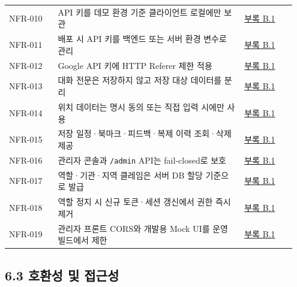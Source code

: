 \documentclass[12pt,a4paper]{article}
\newcommand{\DocNeedspace}[1]{\par\ifdim\dimexpr\pagegoal-\pagetotal\relax<#1\newpage\fi}
\renewcommand{\arraystretch}{1.35}
\newcommand{\AppendixRef}[2]{\hyperlink{app:#1#2}{부록 #1.#2}}
\begin{document}
\DocNeedspace{26\baselineskip}
\begin{small}
\setlength{\tabcolsep}{3pt}
\setlength{\extrarowheight}{1pt}
\renewcommand{\arraystretch}{1.42}
\begin{longtable}{@{}>{\centering\arraybackslash}m{0.160\linewidth}>{\RaggedRight\arraybackslash}m{0.613\linewidth}>{\centering\arraybackslash}m{0.174\linewidth}@{}}
\toprule
\multicolumn{1}{>{\centering\arraybackslash}m{0.160\linewidth}}{\textbf{ID}} & \multicolumn{1}{>{\centering\arraybackslash}m{0.613\linewidth}}{\textbf{핵심 요구}} & \multicolumn{1}{>{\centering\arraybackslash}m{0.174\linewidth}}{\textbf{상세 위치}} \\
\midrule
\endhead
NFR-010 & API 키를 데모 환경 기준 클라이언트 로컬에만 보관 & \AppendixRef{B}{1} \\
NFR-011 & 배포 시 API 키를 백엔드 또는 서버 환경 변수로 관리 & \AppendixRef{B}{1} \\
NFR-012 & Google API 키에 HTTP Referer 제한 적용 & \AppendixRef{B}{1} \\
NFR-013 & 대화 전문은 저장하지 않고 저장 대상 데이터를 분리 & \AppendixRef{B}{1} \\
NFR-014 & 위치 데이터는 명시 동의 또는 직접 입력 시에만 사용 & \AppendixRef{B}{1} \\
NFR-015 & 저장 일정·북마크·피드백·복제 이력 조회·삭제 제공 & \AppendixRef{B}{1} \\
NFR-016 & 관리자 콘솔과 \texttt{/\allowbreak{}admin} API는 fail-closed로 보호 & \AppendixRef{B}{1} \\
NFR-017 & 역할·기관·지역 클레임은 서버 DB 할당 기준으로 발급 & \AppendixRef{B}{1} \\
NFR-018 & 역할 정지 시 신규 토큰·세션 갱신에서 권한 즉시 제거 & \AppendixRef{B}{1} \\
NFR-019 & 관리자 프론트 CORS와 개발용 Mock UI를 운영 빌드에서 제한 & \AppendixRef{B}{1} \\
\bottomrule
\end{longtable}
\end{small}


\DocNeedspace{24\baselineskip}
\subsection*{6.3 호환성 및 접근성}
\end{document}
